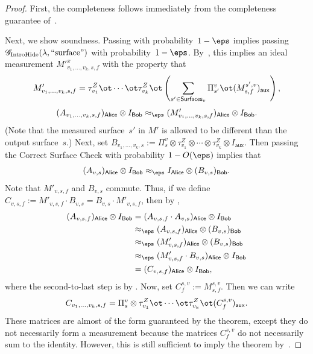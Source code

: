 \documentclass[11pt]{article}
\newcommand{\game}{\mathscr{G}}
\newcommand{\reg}[1]{{\mathsf{#1}}}
\newcommand{\surfaces}[1]{\mathsf{Surfaces}_{#1}}
\begin{document}
\begin{proof}
First, the completeness follows immediately from
the completeness guarantee of~.

Next, we show soundness.
Passing with probability~$1-\eps$
implies passing $\game_{\mathrm{IntroHide}}(\lambda, \mathrm{``surface"})$ with probability~$1-\eps$.
By~, this implies an ideal measurement $M'^x_{v_1, \ldots, v_k, s, f}$ with
      the property that
      \begin{equation*} M'_{v_1, \dots, v_k, s, f} = 
        \tau^Z_{v_1} \ot \cdots \ot \tau^Z_{v_k} \ot \left( \sum_{s' \in \surfaces{v}} \Pi^{v}_{s'} \ot
          (M^{s', v}_{s, f})_{\reg{aux}}\right), \end{equation*}
      \[ (A_{v_1, \ldots, v_k,s, f})_{\reg{Alice}}
      		\otimes I_{\reg{Bob}} \approx_\eps (M'_{v_1, \ldots, v_k, s, f})_{\reg{Alice}} \otimes I_{\reg{Bob}}. \]
(Note that the measured surface~$s'$ in $M'$ is allowed to be different than the output surface~$s$.)
Next, set
$
B_{v_1, \ldots, v_k, s} := \Pi^v_{s} \otimes \tau^Z_{v_1} \otimes \cdots \otimes \tau^Z_{v_k} \otimes I_{\reg{aux}}.
$
Then passing the Correct Surface Check with probability $1-O(\eps)$ implies that
\begin{equation*}
(A_{v, s})_{\reg{Alice}} \otimes I_{\reg{Bob}}
\approx_{\eps} I_{\reg{Alice}} \otimes (B_{v, s})_{\reg{Bob}}.
\end{equation*}
Note that $M'_{v, s, f}$ and $B_{v, s}$ commute.
Thus, if we define $C_{v, s, f} := M'_{v, s, f} \cdot B_{v, s} = B_{v, s} \cdot M'_{v, s, f}$, then by ,
\begin{align*}
(A_{v, s, f})_{\reg{Alice}} \otimes I_{\reg{Bob}}
&= (A_{v, s, f} \cdot A_{v, s})_{\reg{Alice}} \otimes I_{\reg{Bob}}\\
&\approx_\eps (A_{v, s, f})_{\reg{Alice}} \otimes (B_{v, s})_{\reg{Bob}}\\
&\approx_\eps (M'_{v, s, f})_{\reg{Alice}} \otimes (B_{v, s})_{\reg{Bob}}\\
&\approx_\eps (M'_{v, s, f} \cdot B_{v, s})_{\reg{Alice}} \otimes I_{\reg{Bob}}\\
&= (C_{v, s, f})_{\reg{Alice}} \otimes I_{\reg{Bob}},
\end{align*}
where the second-to-last step is by .
Now, set $C^{s, v}_f := M^{s, v}_{s, f}$. Then we can write
\begin{equation*}
C_{v_1, \dots, v_k, s, f} = \Pi^v_s \otimes
	\tau^Z_{v_1} \ot \cdots \ot \tau^Z_{v_k} \ot (C^{s, v}_{f})_{\reg{aux}}.
\end{equation*}
These matrices are almost of the form guaranteed by the theorem,
except they do not necessarily form a measurement because the matrices
$C^{s, v}_f$ do not necessarily sum to the identity.
However, this is still sufficient to imply the theorem by~.
\end{proof}
\end{document}
